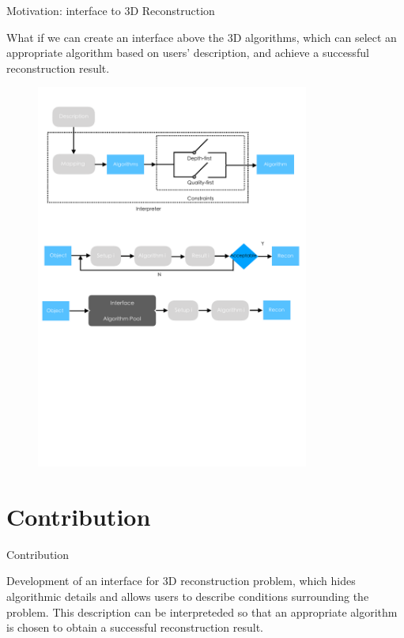 \documentclass[10pt]{beamer}
\begin{document}
\begin{frame}{Motivation: interface to 3D Reconstruction}

What if we can create an interface above the 3D algorithms, which can select an appropriate algorithm based on users' description, and achieve a successful reconstruction result.

\begin{figure}
\centering
\includegraphics[width=0.8\textwidth]{images/interface_3d_vision.pdf}
\end{figure}

\end{frame}

\section{Contribution}
\begin{frame}{Contribution}

Development of an interface for 3D reconstruction problem, which hides algorithmic details and allows users to describe conditions surrounding the problem. This description can be interpreteded so that an appropriate algorithm is chosen to obtain a successful reconstruction result.

\end{frame}
\end{document}
